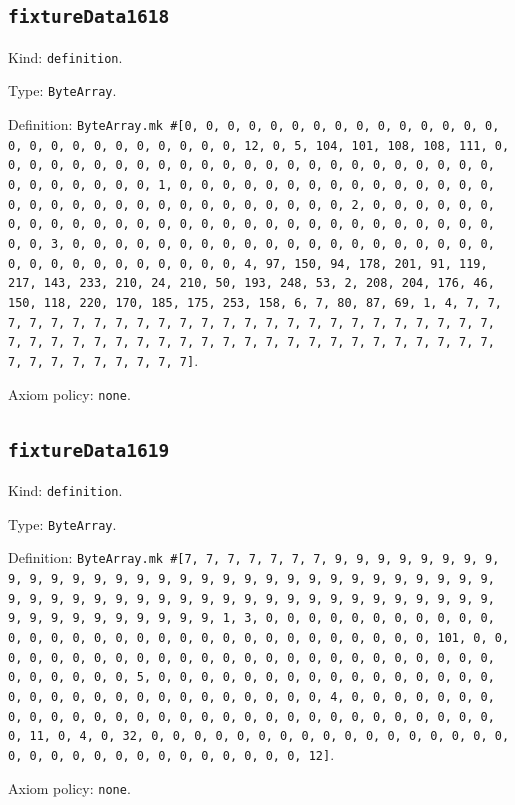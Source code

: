 \documentclass[11pt]{article}
\begin{document}
\subsection*{\texttt{fixtureData1618}}
\noindent Kind: \texttt{definition}.\par
\noindent Type: \texttt{ByteArray}.\par
\noindent Definition: \texttt{ByteArray.mk \#[0, 0, 0, 0, 0, 0, 0, 0, 0, 0, 0, 0, 0, 0, 0, 0, 0, 0, 0, 0, 0, 0, 0, 0, 0, 0, 12, 0, 5, 104, 101, 108, 108, 111, 0, 0, 0, 0, 0, 0, 0, 0, 0, 0, 0, 0, 0, 0, 0, 0, 0, 0, 0, 0, 0, 0, 0, 0, 0, 0, 0, 0, 0, 0, 0, 1, 0, 0, 0, 0, 0, 0, 0, 0, 0, 0, 0, 0, 0, 0, 0, 0, 0, 0, 0, 0, 0, 0, 0, 0, 0, 0, 0, 0, 0, 0, 0, 2, 0, 0, 0, 0, 0, 0, 0, 0, 0, 0, 0, 0, 0, 0, 0, 0, 0, 0, 0, 0, 0, 0, 0, 0, 0, 0, 0, 0, 0, 0, 0, 3, 0, 0, 0, 0, 0, 0, 0, 0, 0, 0, 0, 0, 0, 0, 0, 0, 0, 0, 0, 0, 0, 0, 0, 0, 0, 0, 0, 0, 0, 0, 0, 4, 97, 150, 94, 178, 201, 91, 119, 217, 143, 233, 210, 24, 210, 50, 193, 248, 53, 2, 208, 204, 176, 46, 150, 118, 220, 170, 185, 175, 253, 158, 6, 7, 80, 87, 69, 1, 4, 7, 7, 7, 7, 7, 7, 7, 7, 7, 7, 7, 7, 7, 7, 7, 7, 7, 7, 7, 7, 7, 7, 7, 7, 7, 7, 7, 7, 7, 7, 7, 7, 7, 7, 7, 7, 7, 7, 7, 7, 7, 7, 7, 7, 7, 7, 7, 7, 7, 7, 7, 7, 7, 7, 7, 7, 7]}.\par
\noindent Axiom policy: \texttt{none}.\par
\subsection*{\texttt{fixtureData1619}}
\noindent Kind: \texttt{definition}.\par
\noindent Type: \texttt{ByteArray}.\par
\noindent Definition: \texttt{ByteArray.mk \#[7, 7, 7, 7, 7, 7, 7, 9, 9, 9, 9, 9, 9, 9, 9, 9, 9, 9, 9, 9, 9, 9, 9, 9, 9, 9, 9, 9, 9, 9, 9, 9, 9, 9, 9, 9, 9, 9, 9, 9, 9, 9, 9, 9, 9, 9, 9, 9, 9, 9, 9, 9, 9, 9, 9, 9, 9, 9, 9, 9, 9, 9, 9, 9, 9, 9, 9, 9, 9, 9, 9, 1, 3, 0, 0, 0, 0, 0, 0, 0, 0, 0, 0, 0, 0, 0, 0, 0, 0, 0, 0, 0, 0, 0, 0, 0, 0, 0, 0, 0, 0, 0, 0, 0, 101, 0, 0, 0, 0, 0, 0, 0, 0, 0, 0, 0, 0, 0, 0, 0, 0, 0, 0, 0, 0, 0, 0, 0, 0, 0, 0, 0, 0, 0, 0, 0, 5, 0, 0, 0, 0, 0, 0, 0, 0, 0, 0, 0, 0, 0, 0, 0, 0, 0, 0, 0, 0, 0, 0, 0, 0, 0, 0, 0, 0, 0, 0, 0, 4, 0, 0, 0, 0, 0, 0, 0, 0, 0, 0, 0, 0, 0, 0, 0, 0, 0, 0, 0, 0, 0, 0, 0, 0, 0, 0, 0, 0, 0, 0, 0, 11, 0, 4, 0, 32, 0, 0, 0, 0, 0, 0, 0, 0, 0, 0, 0, 0, 0, 0, 0, 0, 0, 0, 0, 0, 0, 0, 0, 0, 0, 0, 0, 0, 0, 0, 0, 12]}.\par
\noindent Axiom policy: \texttt{none}.\par
\end{document}
